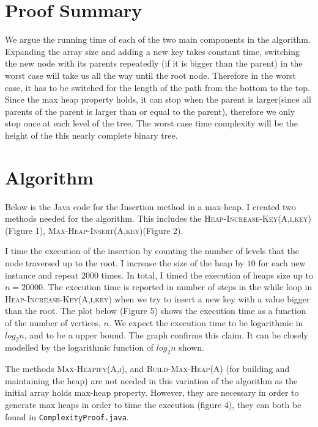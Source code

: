 \documentclass[12pt]{article}
\begin{document}
\section*{Proof Summary}
We argue the running time of each of the two main components in the algorithm. Expanding the array size and adding a new key takes constant time, switching the new node with its parents repeatedly (if it is bigger than the parent) in the worst case will take us all the way until the root node. Therefore in the worst case, it has to be switched for the length of the path from the bottom to the top. Since the max heap property holds, it can stop when the parent is larger(since all parents of the parent is larger than or equal to the parent), therefore we only stop once at each level of the tree. The worst case time complexity will be the height of the this nearly complete binary tree.

\section*{Algorithm}
Below is the Java code for the Insertion method in a max-heap. I created two methods needed for the algorithm. This includes the \textsc{Heap-Increase-Key(A,i,key)} (Figure 1), \textsc{Max-Heap-Insert(A,key)}(Figure 2). 

I time the execution of the insertion by counting the number of levels that the node traversed up to the root. I increase the size of the heap by $10$ for each new instance and repeat $2000$ times. In total, I timed the execution of heaps size up to $n=20000$. The execution time is reported in number of steps in the while loop in \textsc{Heap-Increase-Key(A,i,key)} when we try to insert a new key with a value bigger than the root. The plot below (Figure 5) shows the execution time as a function of the number of vertices, $n$. We expect the execution time to be logarithmic in $log_{2}{n}$, and to be a upper bound. The graph confirms this claim. It can be closely modelled by the logarithmic function of $log_{2}{n}$ shown. 

The methods \textsc{Max-Heapify(A,i)}, and \textsc {Build-Max-Heap(A)} (for building and maintaining the heap) are not needed in this variation of the algorithm as the initial array holds max-heap property. However, they are necessary in order to generate max heaps in order to time the execution (figure 4), they can both be found in \texttt{ComplexityProof.java}.
\end{document}
